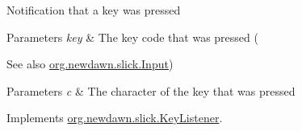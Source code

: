 Notification that a key was pressed


\begin{DoxyParams}{Parameters}
{\em key} & The key code that was pressed (\\
\hline
\end{DoxyParams}
\begin{DoxySeeAlso}{See also}
\mbox{\hyperlink{classorg_1_1newdawn_1_1slick_1_1_input}{org.\+newdawn.\+slick.\+Input}}) 
\end{DoxySeeAlso}

\begin{DoxyParams}{Parameters}
{\em c} & The character of the key that was pressed \\
\hline
\end{DoxyParams}


Implements \mbox{\hyperlink{interfaceorg_1_1newdawn_1_1slick_1_1_key_listener_ac0b0568a21ef486c4f51382614c196ef}{org.\+newdawn.\+slick.\+Key\+Listener}}.


